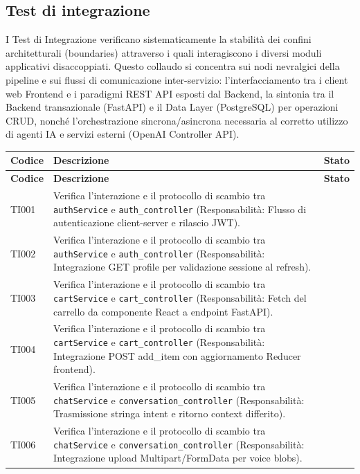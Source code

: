 \documentclass[a4paper,11pt,oneside]{scrartcl}
\begin{document}
\subsection{Test di integrazione}
I Test di Integrazione verificano sistematicamente la stabilità dei confini architetturali (boundaries) attraverso i quali interagiscono i diversi moduli applicativi disaccoppiati. Questo collaudo si concentra sui nodi nevralgici della pipeline e sui flussi di comunicazione inter-servizio: l'interfacciamento tra i client web Frontend e i paradigmi REST API esposti dal Backend, la sintonia tra il Backend transazionale (FastAPI) e il Data Layer (PostgreSQL) per operazioni CRUD, nonché l'orchestrazione sincrona/asincrona necessaria al corretto utilizzo di agenti IA e servizi esterni (OpenAI Controller API).
\begin{longtable}{|p{1.9cm}|p{11.6cm}|c|}
\hline
\rowcolor[gray]{0.9}
\textbf{Codice} & \textbf{Descrizione} & \textbf{Stato} \\
\hline
\endfirsthead
\hline
\rowcolor[gray]{0.9}
\textbf{Codice} & \textbf{Descrizione} & \textbf{Stato} \\
\hline
\endhead
TI001 & Verifica l'interazione e il protocollo di scambio tra \texttt{authService} e \texttt{auth\_controller} (Responsabilità: Flusso di autenticazione client-server e rilascio JWT). & \\ \hline
TI002 & Verifica l'interazione e il protocollo di scambio tra \texttt{authService} e \texttt{auth\_controller} (Responsabilità: Integrazione GET profile per validazione sessione al refresh). & \\ \hline
TI003 & Verifica l'interazione e il protocollo di scambio tra \texttt{cartService} e \texttt{cart\_controller} (Responsabilità: Fetch del carrello da componente React a endpoint FastAPI). & \\ \hline
TI004 & Verifica l'interazione e il protocollo di scambio tra \texttt{cartService} e \texttt{cart\_controller} (Responsabilità: Integrazione POST add\_item con aggiornamento Reducer frontend). & \\ \hline
TI005 & Verifica l'interazione e il protocollo di scambio tra \texttt{chatService} e \texttt{conversation\_controller} (Responsabilità: Trasmissione stringa intent e ritorno context differito). & \\ \hline
TI006 & Verifica l'interazione e il protocollo di scambio tra \texttt{chatService} e \texttt{conversation\_controller} (Responsabilità: Integrazione upload Multipart/FormData per voice blobs). & \\ \hline

\end{longtable}
\end{document}
